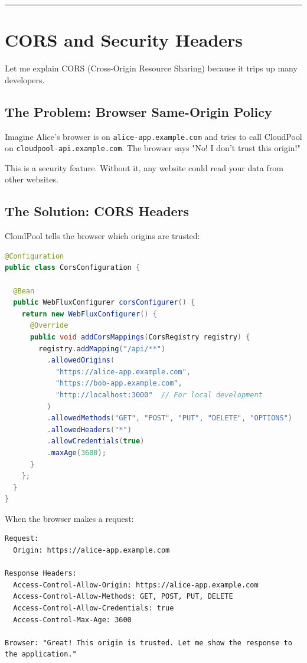 \documentclass[11pt,a4paper]{report}
\begin{document}
\vfill\hrule\vfill



\chapter{CORS and Security Headers}


Let me explain CORS (Cross-Origin Resource Sharing) because it trips up many developers.


\section{The Problem: Browser Same-Origin Policy}


Imagine Alice's browser is on \texttt{alice-app.example.com} and tries to call CloudPool on \texttt{cloudpool-api.example.com}. The browser says "No! I don't trust this origin!"

This is a security feature. Without it, any website could read your data from other websites.


\section{The Solution: CORS Headers}


CloudPool tells the browser which origins are trusted:

\begin{lstlisting}[language=Java]
@Configuration
public class CorsConfiguration {
  
  @Bean
  public WebFluxConfigurer corsConfigurer() {
    return new WebFluxConfigurer() {
      @Override
      public void addCorsMappings(CorsRegistry registry) {
        registry.addMapping("/api/**")
          .allowedOrigins(
            "https://alice-app.example.com",
            "https://bob-app.example.com",
            "http://localhost:3000"  // For local development
          )
          .allowedMethods("GET", "POST", "PUT", "DELETE", "OPTIONS")
          .allowedHeaders("*")
          .allowCredentials(true)
          .maxAge(3600);
      }
    };
  }
}
\end{lstlisting}

When the browser makes a request:
\begin{lstlisting}[language=text]
Request:
  Origin: https://alice-app.example.com

Response Headers:
  Access-Control-Allow-Origin: https://alice-app.example.com
  Access-Control-Allow-Methods: GET, POST, PUT, DELETE
  Access-Control-Allow-Credentials: true
  Access-Control-Max-Age: 3600

Browser: "Great! This origin is trusted. Let me show the response to the application."
\end{lstlisting}
\end{document}
